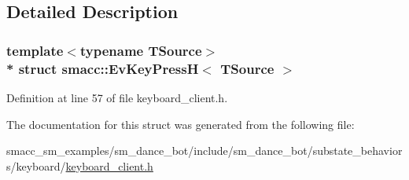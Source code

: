 \subsection{Detailed Description}
\subsubsection*{template$<$typename T\+Source$>$\\*
struct smacc\+::\+Ev\+Key\+Press\+H$<$ T\+Source $>$}



Definition at line 57 of file keyboard\+\_\+client.\+h.



The documentation for this struct was generated from the following file\+:\begin{DoxyCompactItemize}
\item 
smacc\+\_\+sm\+\_\+examples/sm\+\_\+dance\+\_\+bot/include/sm\+\_\+dance\+\_\+bot/substate\+\_\+behaviors/keyboard/\hyperlink{keyboard__client_8h}{keyboard\+\_\+client.\+h}\end{DoxyCompactItemize}
